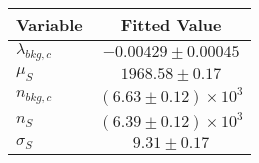 \begin{tabular}[t]{lc}
\hline
Variable &Fitted Value\\
\hline\hline
$\lambda_{bkg,c}$&$-0.00429\pm0.00045$\\
\hline
$\mu_{S}$&$1968.58\pm0.17$\\
\hline
$n_{bkg,c}$&$(6.63\pm0.12)\times 10^3$\\
\hline
$n_{S}$&$(6.39\pm0.12)\times 10^3$\\
\hline
$\sigma_{S}$&$9.31\pm0.17$\\
\hline
\end{tabular}